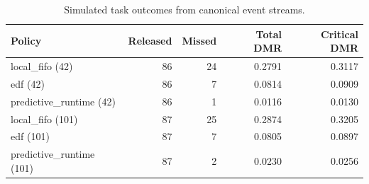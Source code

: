 \begin{table}[t]
\centering
\caption{Simulated task outcomes from canonical event streams.}
\begin{tabular}{lrrrr}
\toprule
Policy & Released & Missed & Total DMR & Critical DMR \\
\midrule
local_fifo (42) & 86 & 24 & 0.2791 & 0.3117 \\
edf (42) & 86 & 7 & 0.0814 & 0.0909 \\
predictive_runtime (42) & 86 & 1 & 0.0116 & 0.0130 \\
local_fifo (101) & 87 & 25 & 0.2874 & 0.3205 \\
edf (101) & 87 & 7 & 0.0805 & 0.0897 \\
predictive_runtime (101) & 87 & 2 & 0.0230 & 0.0256 \\
\bottomrule
\end{tabular}
\end{table}
